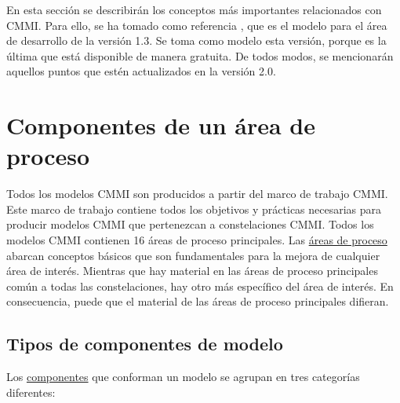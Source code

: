 En esta sección se describirán los conceptos más importantes relacionados con CMMI. Para ello, se ha tomado como referencia \cite{ProductCMMIfor2010}, que es el modelo para el área de desarrollo de la versión 1.3. Se toma como modelo esta versión, porque es la última que está disponible de manera gratuita. De todos modos, se mencionarán aquellos puntos que estén actualizados en la versión 2.0.

\section{Componentes de un área de proceso}
Todos los modelos CMMI son producidos a partir del marco de trabajo CMMI. Este marco de trabajo contiene todos los objetivos y prácticas necesarias para producir modelos CMMI que pertenezcan a constelaciones CMMI. Todos los modelos CMMI contienen 16 áreas de proceso principales. Las \hyperlink{processarea}{áreas de proceso} abarcan conceptos básicos que son fundamentales para la mejora de cualquier área de interés. Mientras que hay material en las áreas de proceso principales común a todas las constelaciones, hay otro más específico del área de interés. En consecuencia, puede que el material de las áreas de proceso principales difieran.


\subsection{Tipos de componentes de modelo}
Los \hyperlink{componente}{componentes} que conforman un modelo se agrupan en tres categorías diferentes:

